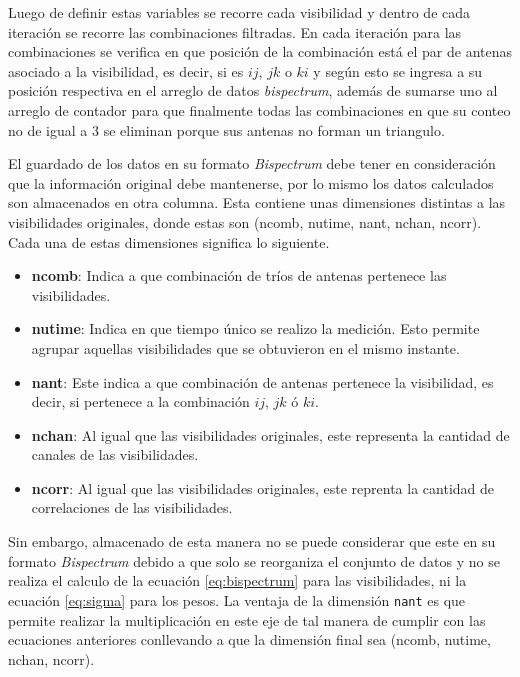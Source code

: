 Luego de definir estas variables se recorre cada visibilidad y dentro de cada iteración se recorre las combinaciones filtradas. En cada iteración para las combinaciones se verifica en que posición de la combinación está el par de antenas asociado a la visibilidad, es decir, si es $ij$, $jk$ o $ki$ y según esto se ingresa a su posición respectiva en el arreglo de datos \textit{bispectrum}, además de sumarse uno al arreglo de contador para que finalmente todas las combinaciones en que su conteo no de igual a 3 se eliminan porque sus antenas no forman un triangulo.  

El guardado de los datos en su formato \textit{Bispectrum} debe tener en consideración que la información original debe mantenerse, por lo mismo los datos calculados son almacenados en otra columna. Esta contiene unas dimensiones distintas a las visibilidades originales, donde estas son (ncomb, nutime, nant, nchan, ncorr). Cada una de estas dimensiones significa lo siguiente.

\begin{itemize}
    \item \textbf{ncomb}: Indica a que combinación de tríos de antenas pertenece las visibilidades. 
    \item \textbf{nutime}: Indica en que tiempo único se realizo la medición. Esto permite agrupar aquellas visibilidades que se obtuvieron en el mismo instante.    
    \item \textbf{nant}: Este indica a que combinación de antenas pertenece la visibilidad, es decir, si pertenece a la combinación $ij$, $jk$ ó $ki$. 
    \item \textbf{nchan}: Al igual que las visibilidades originales, este representa la cantidad de canales de las visibilidades. 
    \item \textbf{ncorr}: Al igual que las visibilidades originales, este reprenta la cantidad de correlaciones de las visibilidades.  
\end{itemize}

Sin embargo, almacenado de esta manera no se puede considerar que este en su formato \textit{Bispectrum} debido a que solo se reorganiza el conjunto de datos y no se realiza el calculo de la ecuación \ref{eq:bispectrum} para las visibilidades, ni la ecuación \ref{eq:sigma} para los pesos. La ventaja de la dimensión \texttt{nant} es que permite realizar la multiplicación en este eje de tal manera de cumplir con las ecuaciones anteriores conllevando a que la dimensión final sea (ncomb, nutime, nchan, ncorr). 

